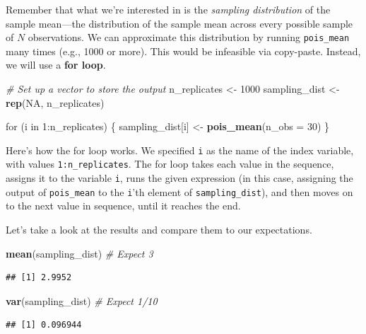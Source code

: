 \documentclass[12pt,oneside,openany]{book}
\newenvironment{Shaded}{\begin{snugshade}}{\end{snugshade}}
\newcommand{\KeywordTok}[1]{\textcolor[rgb]{0.13,0.29,0.53}{\textbf{{#1}}}}
\newcommand{\DataTypeTok}[1]{\textcolor[rgb]{0.13,0.29,0.53}{{#1}}}
\newcommand{\DecValTok}[1]{\textcolor[rgb]{0.00,0.00,0.81}{{#1}}}
\newcommand{\StringTok}[1]{\textcolor[rgb]{0.31,0.60,0.02}{{#1}}}
\newcommand{\CommentTok}[1]{\textcolor[rgb]{0.56,0.35,0.01}{\textit{{#1}}}}
\newcommand{\OtherTok}[1]{\textcolor[rgb]{0.56,0.35,0.01}{{#1}}}
\newcommand{\NormalTok}[1]{{#1}}
\begin{document}
Remember that what we're interested in is the \emph{sampling
distribution} of the sample mean---the distribution of the sample mean
across every possible sample of \(N\) observations. We can approximate
this distribution by running \texttt{pois\_mean} many times (e.g., 1000
or more). This would be infeasible via copy-paste. Instead, we will use
a \textbf{for loop}.

\begin{Shaded}
\begin{Highlighting}[]
\CommentTok{# Set up a vector to store the output}
\NormalTok{n_replicates <-}\StringTok{ }\DecValTok{1000}
\NormalTok{sampling_dist <-}\StringTok{ }\KeywordTok{rep}\NormalTok{(}\OtherTok{NA}\NormalTok{, n_replicates)}

\NormalTok{for (i in }\DecValTok{1}\NormalTok{:n_replicates) \{}
  \NormalTok{sampling_dist[i] <-}\StringTok{ }\KeywordTok{pois_mean}\NormalTok{(}\DataTypeTok{n_obs =} \DecValTok{30}\NormalTok{)}
\NormalTok{\}}
\end{Highlighting}
\end{Shaded}

Here's how the for loop works. We specified \texttt{i} as the name of
the index variable, with values \texttt{1:n\_replicates}. The for loop
takes each value in the sequence, assigns it to the variable \texttt{i},
runs the given expression (in this case, assigning the output of
\texttt{pois\_mean} to the \texttt{i}'th element of
\texttt{sampling\_dist}), and then moves on to the next value in
sequence, until it reaches the end.

Let's take a look at the results and compare them to our expectations.

\begin{Shaded}
\begin{Highlighting}[]
\KeywordTok{mean}\NormalTok{(sampling_dist)  }\CommentTok{# Expect 3}
\end{Highlighting}
\end{Shaded}

\begin{verbatim}
## [1] 2.9952
\end{verbatim}

\begin{Shaded}
\begin{Highlighting}[]
\KeywordTok{var}\NormalTok{(sampling_dist)  }\CommentTok{# Expect 1/10}
\end{Highlighting}
\end{Shaded}

\begin{verbatim}
## [1] 0.096944
\end{verbatim}
\end{document}
